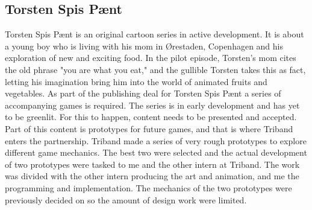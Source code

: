 \subsection{Torsten Spis P{{\ae}}nt}
Torsten Spis P{\ae}nt is an original cartoon series in active development. It is about a young boy who is living with his mom in {\O}restaden, Copenhagen and his exploration of new and exciting food. In the pilot episode, Torsten's mom cites the old phrase "you are what you eat," and the gullible Torsten takes this as fact, letting his imagination bring him into the world of animated fruits and vegetables. \newline
As part of the publishing deal for Torsten Spis P{\ae}nt a series of accompanying games is required. The series is in early development and has yet to be greenlit. For this to happen, content needs to be presented and accepted. Part of this content is prototypes for future games, and that is where Triband enters the partnership. Triband made a series of very rough prototypes to explore different game mechanics. The best two were selected and the actual development of two prototypes were tasked to me and the other intern at Triband. The work was divided with the other intern producing the art and animation, and me the programming and implementation. The mechanics of the two prototypes were previously decided on so the amount of design work were limited.


